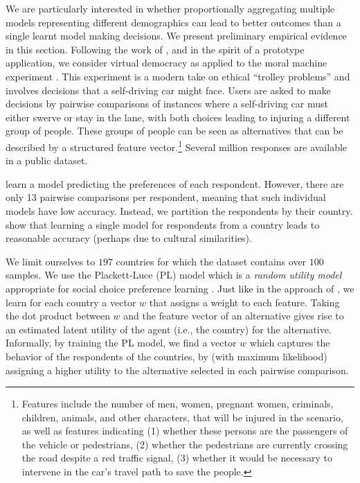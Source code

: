 \documentclass[10pt]{scrartcl}
\theoremstyle{plain}
\theoremstyle{definition}
\begin{document}
We are particularly interested in whether proportionally aggregating multiple models representing different demographics can lead to better outcomes than a single learnt model making decisions. We present preliminary empirical evidence in this section.
Following the work of \citet{noothigattu2018voting}, and in the spirit of a prototype application, we consider virtual democracy as applied to the moral machine experiment \citep{awad2018moral}. This experiment is a modern take on ethical ``trolley problems'' and involves decisions that a self-driving car might face. Users are asked to make decisions by pairwise comparisons of instances where a self-driving car must either swerve or stay in the lane, with both choices leading to injuring a different group of people. These groups of people can be seen as alternatives that can be described by a structured feature vector.\footnote{Features include the number of men, women, pregnant women, criminals, children, animals, and other characters, that will be injured in the scenario, as well as features indicating (1) whether these persons are the passengers of the vehicle or pedestrians, (2) whether the pedestrians are currently crossing the road despite a red traffic signal, (3) whether it would be necessary to intervene in the car's travel path to save the people.}
Several million responses are available in a public dataset.

\citet{noothigattu2018voting} learn a model predicting the preferences of each respondent. However, there are only 13 pairwise comparisons per respondent, meaning that such individual models have low accuracy. Instead, we partition the respondents by their country. \citet{kim2018computational} show that learning a single model for respondents from a country leads to reasonable accuracy (perhaps due to cultural similarities). 

We limit ourselves to $197$ countries for which the dataset contains over $100$ samples. We use the Plackett-Luce (PL) model \citep{plackett1975analysis, duncan1959individual} which is a \emph{random utility model} appropriate for social choice preference learning \citep{azari2012random}. 
Just like in the approach of \citet{noothigattu2018voting}, we learn for each country a vector $w$ that assigns a weight to each feature. Taking the dot product between $w$ and the feature vector of an alternative gives rise to an estimated latent utility of the agent (i.e., the country) for the alternative. 
Informally, by training the PL model, we find a vector $w$ which captures the behavior of the respondents of the countries, by (with maximum likelihood) assigning a higher utility to the alternative selected in each pairwise comparison.
\end{document}
